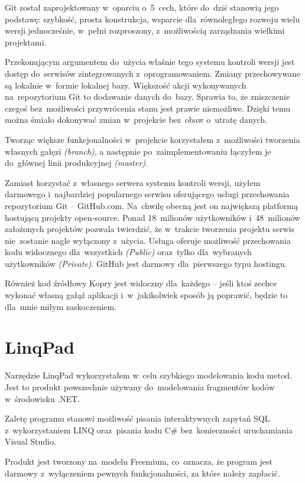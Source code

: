 \documentclass[a4paper,twoside,titlepage,openright]{book}
\begin{document}
Git został zaprojektowany w~oparciu o~5~cech, które do~dziś stanowią jego podstawę: szybkość, prosta konstrukcja, wsparcie dla~równoległego rozwoju wielu wersji jednocześnie, w~pełni rozproszony, z~możliwością zarządzania wielkimi projektami.\cite{git}

Przekonującym argumentem do~użycia właśnie tego systemu kontroli wersji jest dostęp do~serwisów zintegrowanych z~oprogramowaniem. Zmiany przechowywane są lokalnie w~formie lokalnej bazy. Większość akcji wykonywanych na~repozytorium Git to dodawanie danych do~bazy. Sprawia to, że zniszczenie czegoś bez~możliwości przywrócenia stanu jest prawie niemożliwe. Dzięki temu można śmiało dokonywać zmian w~projekcie bez~obaw o~utratę danych. 

Tworząc większe funkcjonalności w~projekcie korzystałem z~możliwości tworzenia własnych gałęzi \textit{(branch)}, a następnie po~zaimplementowaniu łączyłem je do~głównej linii produkcyjnej \textit{(master)}.

Zamiast korzystać z~własnego serwera systemu kontroli wersji, użyłem darmowego i~najbardziej popularnego serwisu oferującego usługi przechowania repozytorium Git -- GitHub.com. Na~chwilę obecną jest on największą platformą hostującą projekty open-source. Ponad 18~milionów użytkowników i~48~milionów założonych projektów pozwala twierdzić, że w~trakcie tworzenia projektu serwis nie~zostanie nagle wyłączony z~użycia. Usługa oferuje możliwość przechowania kodu widocznego dla~wszystkich \textit{(Public)} oraz~tylko dla~wybranych użytkowników \textit{(Private)}. GitHub jest darmowy dla~pierwszego typu hostingu.\cite{gutHubCennik} 

Również kod źródłowy Kopry jest widoczny dla~każdego -- jeśli ktoś zechce wykonać własną gałąź aplikacji i~w~jakikolwiek sposób ją poprawić, będzie to dla~mnie miłym zaskoczeniem.


\section{LinqPad}
Narzędzie LinqPad wykorzystałem w~celu szybkiego modelowania kodu metod. Jest to produkt powszechnie używany do~modelowania fragmentów kodów w~środowisku .NET. 

Zaletę programu stanowi możliwość pisania interaktywnych zapytań SQL z~wykorzystaniem LINQ oraz~pisania kodu C\# bez~konieczności uruchamiania Visual Studio.\cite{linqPad} 

Produkt jest tworzony na~modelu Freemium, co~oznacza, że program jest darmowy z~wyłączeniem pewnych funkcjonalności, za które należy zapłacić.\cite{linqPadWiki}
\end{document}
